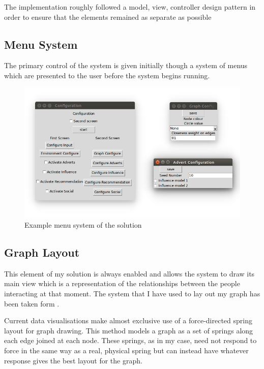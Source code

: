 \documentclass[12pt,a4paper]{article}
\begin{document}
The implementation roughly followed a model, view, controller design pattern in order to ensure that the elements remained as separate as possible

\subsection{Menu System}

The primary control of the system is given initially though a system of menus which are presented to the user before the system begins running.

\begin{figure}[htb]
\begin{center}
\caption{Example menu system of the solution}
\label{fig:menu}
\includegraphics[scale=0.5]{MenuShot.png}
\end{center}
\end{figure}

\subsection{Graph Layout}

This element of my solution is always enabled and allows the system to draw its main view which is a representation of the relationships between the people interacting at that moment. The system that I have used to lay out my graph has been taken form \cite{fruchterman1991graph}.

Current data visualisations make almost exclusive use of a force-directed spring layout for graph drawing. This method models a graph as a set of springs along each edge joined at each node. These springs, as in my case, need not respond to force in the same way as a real, physical spring but can instead have whatever response gives the best layout for the graph.
\end{document}
